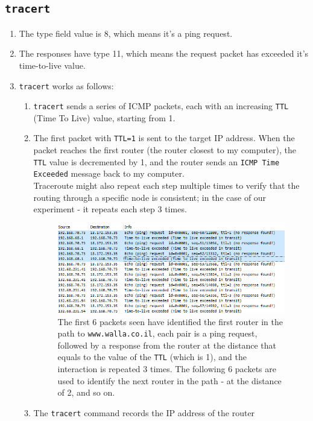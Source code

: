\subsection{\texttt{tracert}}
\begin{enumerate}[label=\alph*.]
	\item The type field value is 8, which means it's a ping request.
	\item The responses have type 11, which means the request packet has
	exceeded it's time-to-live value.
	\item \texttt{tracert} works as follows:
	\begin{enumerate}[label=\arabic*.]
		\item \texttt{tracert} sends a series of ICMP packets, each
		 with an increasing \texttt{TTL} (Time To Live) value, starting from 1.
		\item The first packet with \texttt{TTL=1} is sent to the target IP address.
		 When the packet reaches the first router (the router closest to my computer), the \texttt{TTL} value is decremented by 1,
		 and the router sends an \texttt{ICMP Time Exceeded} message back to my computer.\\
		 Traceroute might also repeat each step multiple times to verify that the routing through a specific
		 node is consistent; in the case of our experiment - it repeats each step 3 times.
		\begin{figure}
			\includegraphics[width=1.2 \textwidth]{Resources/tracert_ws.png}
			\caption{The first 6 packets seen have identified the first router in the path to \texttt{www.walla.co.il},
			each pair is a ping request, followed by a response from the router at the distance that equals to the value of the \texttt{TTL} (which is 1),
			and the interaction is repeated 3 times. The following 6 packets are used to identify the next router in the path - at the distance of 2, and so on.}
		\end{figure}
		\item The \texttt{tracert} command records the IP address of the router

\end{enumerate}
\end{enumerate}

